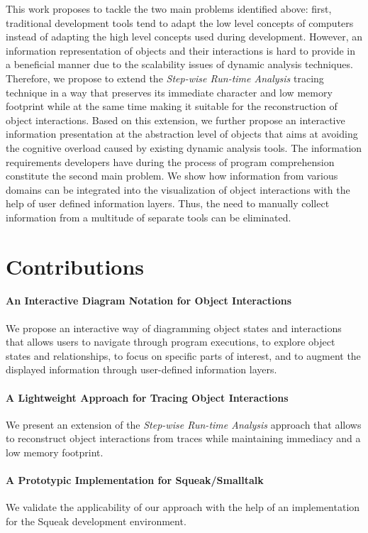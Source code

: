 This work proposes to tackle the two main problems identified above: first, traditional development tools tend to adapt the low level concepts of computers instead of adapting the high level concepts used during development.
However, an information representation of objects and their interactions is hard to provide in a beneficial manner due to the scalability issues of dynamic analysis techniques.
Therefore, we propose to extend the \emph{Step-wise Run-time Analysis} tracing technique in a way that preserves its immediate character and low memory footprint while at the same time making it suitable for the reconstruction of object interactions.
Based on this extension, we further propose an interactive information presentation at the abstraction level of objects that aims at avoiding the cognitive overload caused by existing dynamic analysis tools.
The information requirements developers have during the process of program comprehension constitute the second main problem.
We show how information from various domains can be integrated into the visualization of object interactions with the help of user defined information layers.
Thus, the need to manually collect information from a multitude of separate tools can be eliminated.

\section{Contributions}
\label{s:contributions}

\paragraph{An Interactive Diagram Notation for Object Interactions} We propose an interactive way of diagramming object states and interactions that allows users to navigate through program executions, to explore object states and relationships, to focus on specific parts of interest, and to augment the displayed information through user-defined information layers.

\paragraph{A Lightweight Approach for Tracing Object Interactions} We present an extension of the \emph{Step-wise Run-time Analysis} approach that allows to reconstruct object interactions from traces while maintaining immediacy and a low memory footprint.

\paragraph{A Prototypic Implementation for Squeak/Smalltalk} We validate the applicability of our approach with the help of an implementation for the Squeak development environment.

